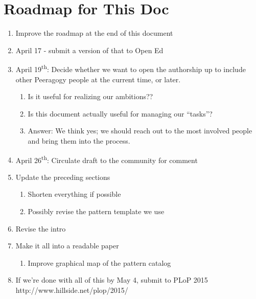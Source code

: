 \section{Roadmap for This Doc}

\begin{enumerate}
\item Improve the roadmap at the end of this document
\item April 17 - submit a version of that to Open Ed
\item April 19\textsuperscript{th}: Decide whether we want to open the authorship up to include other Peeragogy people at the current time, or later. 
\begin{enumerate}
\item Is it useful for realizing our ambitions??
\item Is this document actually useful for managing our ``tasks''?
\item Answer: We think yes; we should reach out to the most involved people and bring them into the process.
\end{enumerate}
\item April 26\textsuperscript{th}: Circulate draft to the community for comment
\item Update the preceding sections
\begin{enumerate}
\item Shorten everything if possible
\item Possibly revise the pattern template we use
\end{enumerate}
\item Revise the intro
\item Make it all into a readable paper
\begin{enumerate}
\item Improve graphical map of the pattern catalog
\end{enumerate}
\item If we're done with all of this by May 4, submit to PLoP 2015 http://www.hillside.net/plop/2015/
\end{enumerate}